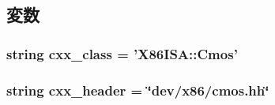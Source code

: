 \subsection{変数}
\hypertarget{classCmos_1_1Cmos_a58cd55cd4023648e138237cfc0822ae3}{
\subsubsection[{cxx\_\-class}]{\setlength{\rightskip}{0pt plus 5cm}string {\bf cxx\_\-class} = '{\bf X86ISA::Cmos}'}}
\label{classCmos_1_1Cmos_a58cd55cd4023648e138237cfc0822ae3}
\hypertarget{classCmos_1_1Cmos_a17da7064bc5c518791f0c891eff05fda}{
\subsubsection[{cxx\_\-header}]{\setlength{\rightskip}{0pt plus 5cm}string {\bf cxx\_\-header} = \char`\"{}dev/x86/cmos.hh\char`\"{}}}
\label{classCmos_1_1Cmos_a17da7064bc5c518791f0c891eff05fda}


